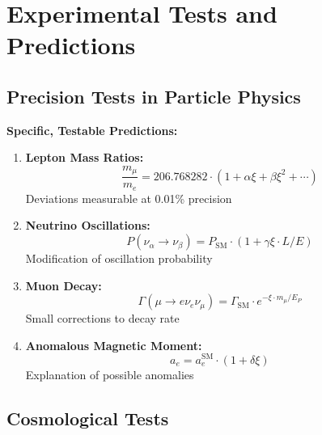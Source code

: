 	\section{Experimental Tests and Predictions}
	
	\subsection{Precision Tests in Particle Physics}
	
	\begin{application}
		\textbf{Specific, Testable Predictions:}
		
		\begin{enumerate}
			\item \textbf{Lepton Mass Ratios:}
			\begin{equation}
				\frac{m_\mu}{m_e} = 206.768282 \cdot (1 + \alpha \xi + \beta \xi^2 + \cdots)
			\end{equation}
			Deviations measurable at 0.01\% precision
			
			\item \textbf{Neutrino Oscillations:}
			\begin{equation}
				P(\nu_\alpha \to \nu_\beta) = P_{\text{SM}} \cdot (1 + \gamma \xi \cdot L/E)
			\end{equation}
			Modification of oscillation probability
			
			\item \textbf{Muon Decay:}
			\begin{equation}
				\Gamma(\mu \to e\nu_e\nu_\mu) = \Gamma_{\text{SM}} \cdot e^{-\xi \cdot m_\mu/E_P}
			\end{equation}
			Small corrections to decay rate
			
			\item \textbf{Anomalous Magnetic Moment:}
			\begin{equation}
				a_e = a_e^{\text{SM}} \cdot (1 + \delta \xi)
			\end{equation}
			Explanation of possible anomalies
		\end{enumerate}
	\end{application}
	
	\subsection{Cosmological Tests}
	
